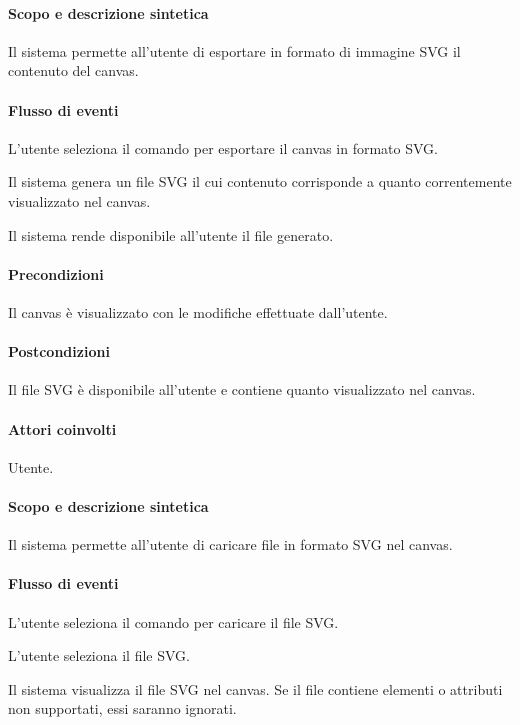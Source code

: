 \paragraph{Scopo e descrizione sintetica} 
Il sistema permette all'utente di esportare in formato di immagine SVG il contenuto del canvas.
\paragraph{Flusso di eventi}
\begin{elenconumerato}[\textbf{}]{\subsubsecindent}
\item L'utente seleziona il comando per esportare il canvas in formato SVG.
\item Il sistema genera un file SVG il cui contenuto corrisponde a quanto correntemente visualizzato nel canvas.
\item Il sistema rende disponibile all'utente il file generato.
\end{elenconumerato}
\paragraph{Precondizioni} Il canvas \`e visualizzato con le modifiche effettuate dall'utente.
\paragraph{Postcondizioni} Il file SVG \`e disponibile all'utente e contiene quanto visualizzato nel canvas.

\paragraph{Attori coinvolti} Utente.
\paragraph{Scopo e descrizione sintetica} 
Il sistema permette all'utente di caricare file in formato SVG nel canvas.
\paragraph{Flusso di eventi}
\begin{elenconumerato}[\textbf{}]{\subsubsecindent}
\item L'utente seleziona il comando per caricare il file SVG.
\item L'utente seleziona il file SVG.
\item Il sistema visualizza il file SVG nel canvas. Se il file contiene elementi o attributi non supportati, essi saranno ignorati.
\end{elenconumerato}
